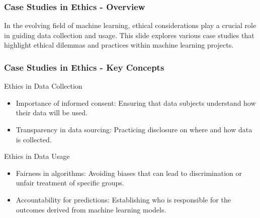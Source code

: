 \documentclass[aspectratio=169]{beamer}
\begin{document}
\begin{frame}[fragile]
    \frametitle{Case Studies in Ethics - Overview}
    In the evolving field of machine learning, ethical considerations play a crucial role in guiding data collection and usage. 
    This slide explores various case studies that highlight ethical dilemmas and practices within machine learning projects.
\end{frame}

\begin{frame}[fragile]
    \frametitle{Case Studies in Ethics - Key Concepts}
    \begin{block}{Ethics in Data Collection}
        \begin{itemize}
            \item Importance of informed consent: Ensuring that data subjects understand how their data will be used.
            \item Transparency in data sourcing: Practicing disclosure on where and how data is collected.
        \end{itemize}
    \end{block}

    \begin{block}{Ethics in Data Usage}
        \begin{itemize}
            \item Fairness in algorithms: Avoiding biases that can lead to discrimination or unfair treatment of specific groups.
            \item Accountability for predictions: Establishing who is responsible for the outcomes derived from machine learning models.
        \end{itemize}
    \end{block}
\end{frame}
\end{document}
